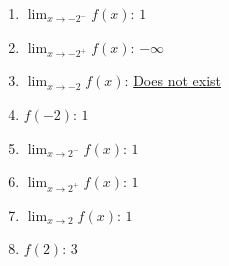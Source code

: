 \documentclass[12pt]{article}
\newcommand{\di}{\displaystyle}
\begin{document}
\begin{enumerate}
\begin{multicols}{2}
\begin{enumerate}
 \bigskip
 
 
 \bigskip
 
 \item $\di\lim_{x \to -2^-}f(x)$: \underline{\hspace{1cm}$1$\hspace{1cm}}
 
 \bigskip

 \bigskip
 
 \item $\di \lim_{x\to -2^+}f(x)$: \underline{\hspace{1cm}$-\infty$\hspace{1cm}}  
 
 \bigskip
 
 \bigskip
 
 \item $\di \lim_{x\to -2}f(x)$: \underline{Does not exist}
 
 \bigskip
 
 \bigskip
 
 \item $f(-2)$: \underline{\hspace{1cm}$1$\hspace{1cm}}

\columnbreak


 \item $\di \lim_{x \to 2^-}f(x)$: \underline{\hspace{1cm}$1$\hspace{1cm}}
 
 \bigskip
 
 \bigskip
 
 \item $\di \lim_{x\to 2^+}f(x)$: \underline{\hspace{1cm}$1$\hspace{1cm}} 

\bigskip

\bigskip

 \item $\di \lim_{x\to 2}f(x)$: \underline{\hspace{1cm}$1$\hspace{1cm}}
 
 \bigskip
 
 \bigskip
 
\item $f(2)$: \underline{\hspace{1cm}$3$\hspace{1cm}}
\end{enumerate}
\end{multicols}
\end{enumerate}
\end{document}
